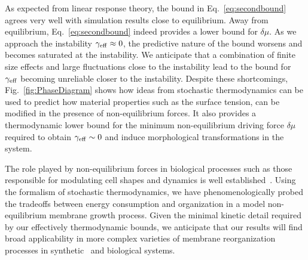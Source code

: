 \documentclass[amsmath,preprintnumbers,10pt,nofootinbib,prl,twocolumn]{revtex4-1}
\begin{document}
As expected from linear response theory, the bound in Eq.~\ref{eq:secondbound} agrees very well with simulation results close to equilibrium. Away from equilibrium, Eq.~\ref{eq:secondbound} indeed provides a lower bound for $\delta \mu$. As we approach the instability $\gamma_{\rm eff}\approx 0$, the predictive nature of the bound worsens and becomes saturated at the instability. We anticipate that a combination of finite size effects and large fluctuations close to the instability lead to the bound for $\gamma_{\rm eff}$ becoming unreliable closer to the instability. Despite these shortcomings, Fig.~\ref{fig:PhaseDiagram} shows how ideas from stochastic thermodynamics can be used to predict how material properties such as the surface tension, can be modified in the presence of non-equilibrium forces. It also provides a thermodynamic lower bound for the minimum non-equilibrium driving force $\delta \mu$ required to obtain $\gamma_{\rm eff}\sim 0$ and induce morphological transformations in the system. 


The role played by non-equilibrium forces in biological processes such as those responsible for modulating cell shapes and dynamics is well established~\cite{McMahon2005,Stachowiak2012,Chen2016,Turlier2016,Rao2001,Solon2006}. Using the formalism of stochastic thermodynamics, we have phenomenologically probed the tradeoffs between energy consumption and organization in a model non-equilibrium membrane growth process. Given the minimal kinetic detail required by our effectively thermodynamic bounds, we anticipate that our results will find broad applicability in more complex varieties of membrane reorganization processes in synthetic~\cite{Zwicker2017} and biological systems. 
\end{document}
